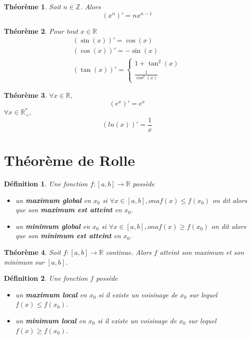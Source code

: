 \documentclass[10pt,a4paper]{book}
\newcommand{\R}{\mathbb{R}}
\newcommand{\Z}{\mathbb{Z}}
\newtheorem{theorem}{Théorème}[section]
\newtheorem{definition}{Définition}[section]
\begin{document}
\begin{theorem}
Soit $n \in \Z$. Alors
\[ (x^n)' = nx^{n-1}\]
\end{theorem}

\begin{theorem}
Pour tout $x \in \R$
\begin{equation*}
\begin{split}
(\sin(x))' = \cos(x) \\
(\cos(x))' = -\sin(x) \\
(\tan(x))' = \left\lbrace \begin{array}{c}
1 + \tan^2(x) \\
\frac{1}{\cos^2(x)}
\end{array} \right.
\end{split}
\end{equation*}
\end{theorem}

\begin{theorem}
$\forall x \in \R,$
\[(e^x)' = e^x\]
$\forall x \in \R^*_+,$
\[(ln(x))' = \frac{1}{x}\]
\end{theorem}

\section{Théorème de Rolle}

\begin{definition}
Une fonction $f: \left[a,b\right] \rightarrow \R$ possède
\begin{itemize}
\item un \textbf{maximum global} en $x_0$ si $\forall x \in \left[a,b\right], on a f(x) \leq f(x_0)$ on dit alors que son \textbf{maximum est atteint} en $x_0$.
\item un \textbf{minimum global} en $x_0$ si $\forall x \in \left[a,b\right], on a f(x) \geq f(x_0)$ on dit alors que son \textbf{minimum est atteint} en $x_0$.
\end{itemize}
\end{definition}

\begin{theorem}
Soit $f:\left[a,b\right] \rightarrow \R$ continue. Alors $f$ atteint son maximum et son minimum sur $\left[a,b\right]$.
\end{theorem}

\begin{definition}
Une fonction $f$ possède
\begin{itemize}
\item un \textbf{maximum local} en $x_0$ si il existe un voisinage de $x_0$ sur lequel $f(x)\leq f(x_0)$.
\item un \textbf{minimum local} en $x_0$ si il existe un voisinage de $x_0$ sur lequel $f(x)\geq f(x_0)$.
\end{itemize}
\end{definition}
\end{document}
